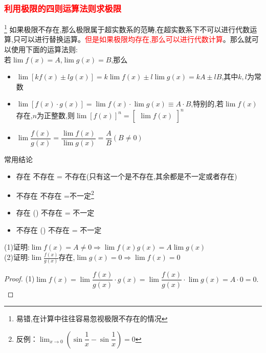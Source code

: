 \documentclass[9pt a4paper, oneside, UTF8]{ctexbook}
\begin{document}
\begin{sloppypar}
    \subsubsection{\textcolor{red}{利用极限的四则运算法则求极限}}\footnote{易错,在计算中往往容易忽视极限不存在的情况}
    如果极限不存在,那么极限属于超实数系的范畴,在超实数系下不可以进行代数运算,只可以进行替换运算。\textcolor{red}{但是如果极限均存在,那么可以进行代数计算}。那么就可以使用下面的运算法则:\\
    若$\lim f(x)=A$,$\lim g(x)=B$,那么
    \begin{itemize}
        \item $\operatorname*{lim}[kf(x)\pm lg(x)]=k\operatorname*{lim}f(x)\pm l\operatorname*{lim}g(x)=kA\pm lB$,其中$k,l$为常数
        \item $\operatorname*{lim}[f(x)\cdot g(x)]=\operatorname*{lim}f(x)\cdot\operatorname*{lim}g(x)\equiv A\cdot B$,特别的,若$\lim f(x)$存在,$n$为正整数,则$\operatorname{lim}[f(x)]^n=\begin{bmatrix}\operatorname{lim}f(x)\end{bmatrix}^n$
        \item $\operatorname*{lim}\dfrac{f(x)}{g(x)}=\dfrac{\operatorname*{lim}f(x)}{\operatorname*{lim}g(x)}=\dfrac{A}{B}(B\neq0)$
    \end{itemize}
    \begin{criterion}{常用结论}{}
        \begin{itemize}
            \item 存在 \pm 不存在 = 不存在(只有这一个是不存在,其余都是不一定或者存在)
            \item 不存在 \pm 不存在 =不一定\footnote{反例：$\lim _{x \to 0}(\sin \dfrac{1}{x}-\sin \dfrac{1}{x})=0$}
            \item 存在 \times (\div) 不存在 = 不一定
            \item 不存在 \times (\div) 不存在 = 不一定
        \end{itemize}
    \end{criterion}
    \begin{problem}
        (1)证明:$\lim f(x)=A \neq 0 \Rightarrow \lim f(x)g(x)=A \lim g(x)$\\
        (2)证明:$\lim \frac{f(x)}{g(x)}$存在,$\lim g(x)=0 \Rightarrow \lim f(x)=0$
    \end{problem}
    \begin{proof}
        (1)$\lim f(x)=\lim\dfrac{f(x)}{g(x)}\cdot g(x)=\lim\dfrac{f(x)}{g(x)}\cdot\lim g(x)=A\cdot0=0.$
        \\

\end{proof}
\end{sloppypar}
\end{document}
